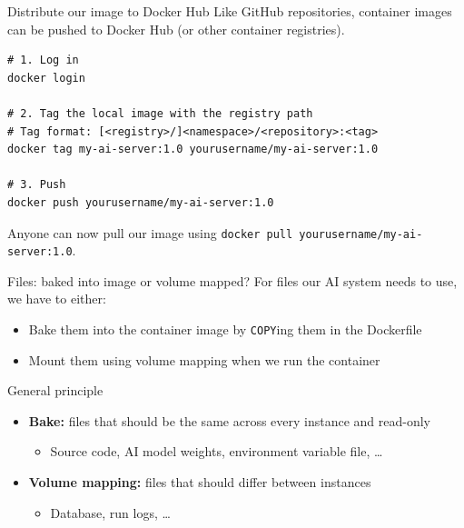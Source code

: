 \documentclass[aspectratio=169]{beamer}
\begin{document}
\begin{frame}[fragile]{Distribute our image to Docker Hub}
  Like GitHub repositories, container images can be pushed to Docker Hub (or other container registries).

    \begin{verbatim}
# 1. Log in
docker login

# 2. Tag the local image with the registry path
# Tag format: [<registry>/]<namespace>/<repository>:<tag>
docker tag my-ai-server:1.0 yourusername/my-ai-server:1.0

# 3. Push
docker push yourusername/my-ai-server:1.0
    \end{verbatim}

    Anyone can now pull our image using \texttt{docker pull yourusername/my-ai-server:1.0}.
\note{
}
\end{frame}


\begin{frame}{Files: baked into image or volume mapped?}
  For files our AI system needs to use, we have to either:
  \begin{itemize}
    \item Bake them into the container image by \texttt{COPY}ing them in the Dockerfile
    \item Mount them using volume mapping when we run the container
  \end{itemize}

  \begin{block}{General principle}
    \begin{itemize}
      \item \textbf{Bake:} files that should be the same across every instance and read-only
        \begin{itemize}
          \item Source code, AI model weights, environment variable file, \dots
        \end{itemize}
      \item \textbf{Volume mapping:} files that should differ between instances
        \begin{itemize}
          \item Database, run logs, \dots
        \end{itemize}
    \end{itemize}
  \end{block}
\note{
}
\end{frame}
\end{document}

